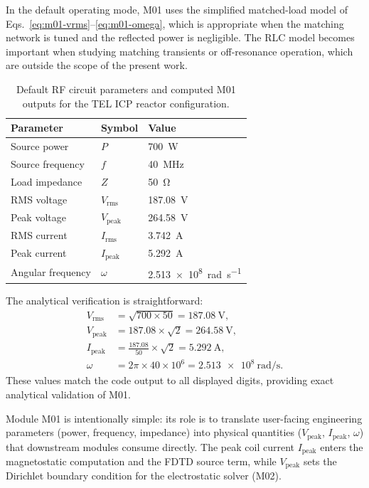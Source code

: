 \documentclass[11pt,a4paper]{report}
\begin{document}
In the default operating mode, M01 uses the simplified matched-load model of Eqs.~\eqref{eq:m01-vrms}--\eqref{eq:m01-omega}, which is appropriate when the matching network is tuned and the reflected power is negligible.  The RLC model becomes important when studying matching transients or off-resonance operation, which are outside the scope of the present work.

\begin{table}[htbp]
  \centering
  \caption{Default RF circuit parameters and computed M01 outputs for the TEL ICP reactor configuration.}
  \label{tab:m01-params}
  \begin{tabular}{@{}lll@{}}
    \toprule
    \textbf{Parameter} & \textbf{Symbol} & \textbf{Value} \\
    \midrule
    Source power        & $P$             & \SI{700}{\watt} \\
    Source frequency    & $f$             & \SI{40}{\mega\hertz} \\
    Load impedance      & $Z$             & \SI{50}{\ohm} \\
    \midrule
    RMS voltage         & $V_\mathrm{rms}$  & \SI{187.08}{\volt} \\
    Peak voltage        & $V_\mathrm{peak}$ & \SI{264.58}{\volt} \\
    RMS current         & $I_\mathrm{rms}$  & \SI{3.742}{\ampere} \\
    Peak current        & $I_\mathrm{peak}$ & \SI{5.292}{\ampere} \\
    Angular frequency   & $\omega$        & \SI{2.513e8}{\radian\per\second} \\
    \bottomrule
  \end{tabular}
\end{table}

The analytical verification is straightforward:
\begin{align}
  V_\mathrm{rms}  &= \sqrt{700 \times 50} = \SI{187.08}{\volt}, \\
  V_\mathrm{peak} &= 187.08 \times \sqrt{2} = \SI{264.58}{\volt}, \\
  I_\mathrm{peak} &= \frac{187.08}{50} \times \sqrt{2} = \SI{5.292}{\ampere}, \\
  \omega          &= 2\pi \times 40 \times 10^6 = \SI{2.513e8}{\radian\per\second}.
\end{align}
These values match the code output to all displayed digits, providing exact analytical validation of M01.

Module M01 is intentionally simple: its role is to translate user-facing engineering parameters (power, frequency, impedance) into physical quantities ($V_\mathrm{peak}$, $I_\mathrm{peak}$, $\omega$) that downstream modules consume directly.  The peak coil current $I_\mathrm{peak}$ enters the magnetostatic computation and the FDTD source term, while $V_\mathrm{peak}$ sets the Dirichlet boundary condition for the electrostatic solver (M02).
\end{document}
